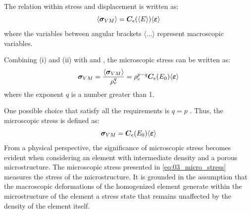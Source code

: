 The relation within stress and displacement is written as:
\begin{equation}
    \langle \bm{\sigma}_{VM} \rangle = \bm{C}_e(\langle E \rangle) \langle \bm{\varepsilon} \rangle
    \label{eq:03_stress_disp}
\end{equation}
where the variables between angular brackets $\langle \dots \rangle$ represent macroscopic variables.

Combining (i) and (ii) with  and , the microscopic stress can be written as:
\begin{equation}
    \bm{\sigma}_{VM} = \frac{\langle \bm{\sigma}_{VM} \rangle}{\rho^q_e} = \rho_e^{p-q} \bm{C}_e(E_0)\langle \bm{\varepsilon} \rangle
\end{equation}
where the exponent $q$ is a number greater than 1.

One possible choice that satisfy all the requirements is $q=p$ . Thus, the microscopic stress is defined as:
\begin{equation}
    \bm{\sigma}_{VM} = \bm{C}_e(E_0)\langle \bm{\varepsilon} \rangle
    \label{eq:03_micro_stress}
\end{equation}
From a physical perspective, the significance of microscopic stress becomes evident when considering an element with intermediate density and a porous microstructure. The microscopic stress presented in \eqref{eq:03_micro_stress} measures the stress of the microstructure. It is grounded in the assumption that the macroscopic deformations of the homogenized element generate within the microstructure of the element a stress state that remains unaffected by the density of the element itself.

